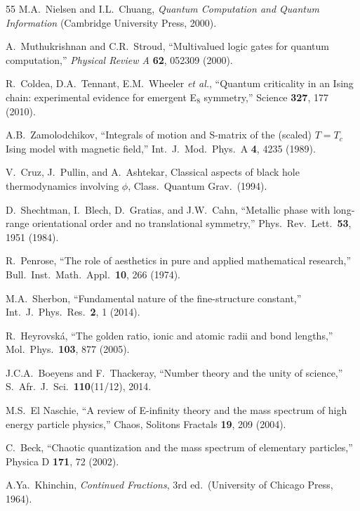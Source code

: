 \documentclass[aps,prd,preprint,superscriptaddress,showpacs,nofootinbib,longbibliography]{revtex4-2}
\begin{document}
\begin{thebibliography}{55}
M.A.~Nielsen and I.L.~Chuang,
\textit{Quantum Computation and Quantum Information} (Cambridge University Press, 2000).

A.~Muthukrishnan and C.R.~Stroud,
``Multivalued logic gates for quantum computation,''
\textit{Physical Review A} \textbf{62}, 052309 (2000).

R.~Coldea, D.A.~Tennant, E.M.~Wheeler \textit{et al.},
``Quantum criticality in an Ising chain: experimental evidence for emergent E$_8$ symmetry,''
Science \textbf{327}, 177 (2010).

A.B.~Zamolodchikov,
``Integrals of motion and S-matrix of the (scaled) $T = T_c$ Ising model with magnetic field,''
Int.\ J.\ Mod.\ Phys.\ A \textbf{4}, 4235 (1989).

V.~Cruz, J.~Pullin, and A.~Ashtekar,
Classical aspects of black hole thermodynamics involving $\phi$,
Class.\ Quantum Grav.\ (1994).

D.~Shechtman, I.~Blech, D.~Gratias, and J.W.~Cahn,
``Metallic phase with long-range orientational order and no translational symmetry,''
Phys.\ Rev.\ Lett.\ \textbf{53}, 1951 (1984).

R.~Penrose,
``The role of aesthetics in pure and applied mathematical research,''
Bull.\ Inst.\ Math.\ Appl.\ \textbf{10}, 266 (1974).

M.A.~Sherbon,
``Fundamental nature of the fine-structure constant,''
Int.\ J.\ Phys.\ Res.\ \textbf{2}, 1 (2014).

R.~Heyrovsk\'{a},
``The golden ratio, ionic and atomic radii and bond lengths,''
Mol.\ Phys.\ \textbf{103}, 877 (2005).

J.C.A.~Boeyens and F.~Thackeray,
``Number theory and the unity of science,''
S.\ Afr.\ J.\ Sci.\ \textbf{110}(11/12), 2014.

M.S.~El Naschie,
``A review of E-infinity theory and the mass spectrum of high energy particle physics,''
Chaos, Solitons Fractals \textbf{19}, 209 (2004).

C.~Beck,
``Chaotic quantization and the mass spectrum of elementary particles,''
Physica D \textbf{171}, 72 (2002).

A.Ya.~Khinchin,
\textit{Continued Fractions}, 3rd ed.\ (University of Chicago Press, 1964).


\end{thebibliography}
\end{document}
